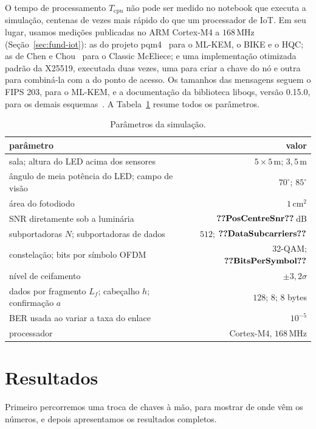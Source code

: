\documentclass[12pt]{article}
\begin{document}
O tempo de processamento $T_{\mathrm{cpu}}$ não pode ser medido no notebook que
executa a simulação, centenas de vezes mais rápido do que um processador de
IoT. Em seu lugar, usamos medições publicadas no ARM Cortex-M4 a $168$\,MHz
(Seção~\ref{sec:fund-iot}): as do projeto pqm4~\cite{pqm4} para o ML-KEM, o
BIKE e o HQC; as de Chen e Chou~\cite{chen2021mceliece} para o Classic
McEliece; e uma implementação otimizada padrão da X25519, executada duas vezes,
uma para criar a chave do nó e outra para combiná-la com a do ponto de acesso.
Os tamanhos das mensagens seguem o FIPS 203, para o ML-KEM, e a documentação da
biblioteca liboqs, versão 0.15.0, para os demais esquemas~\cite{liboqs}. A
Tabela~\ref{tab:params} resume todos os parâmetros.

\begin{table}[!htb]
\caption{Parâmetros da simulação.}
\label{tab:params}
\centering
\small
\begin{tabular}{lr}
\toprule
parâmetro & valor\\
\midrule
sala; altura do LED acima dos sensores & $5\times5$\,m; $3{,}5$\,m\\
ângulo de meia potência do LED; campo de visão & $70^{\circ}$; $85^{\circ}$\\
área do fotodiodo & $1$\,cm$^{2}$\\
SNR diretamente sob a luminária & $\val{PosCentreSnr}$\,dB\\
subportadoras $N$; subportadoras de dados & $512$; $\val{DataSubcarriers}$\\
constelação; bits por símbolo OFDM & 32-QAM; $\val{BitsPerSymbol}$\\
nível de ceifamento & $\pm 3{,}2\sigma$\\
dados por fragmento $L_f$; cabeçalho $h$; confirmação $a$ & $128$; $8$; $8$ bytes\\
BER usada ao variar a taxa do enlace & $10^{-5}$\\
processador & Cortex-M4, $168$\,MHz\\
\bottomrule
\end{tabular}
\end{table}

\section{Resultados}\label{sec:results}
Primeiro percorremos uma troca de chaves à mão, para mostrar de onde vêm os
números, e depois apresentamos os resultados completos.
\end{document}
